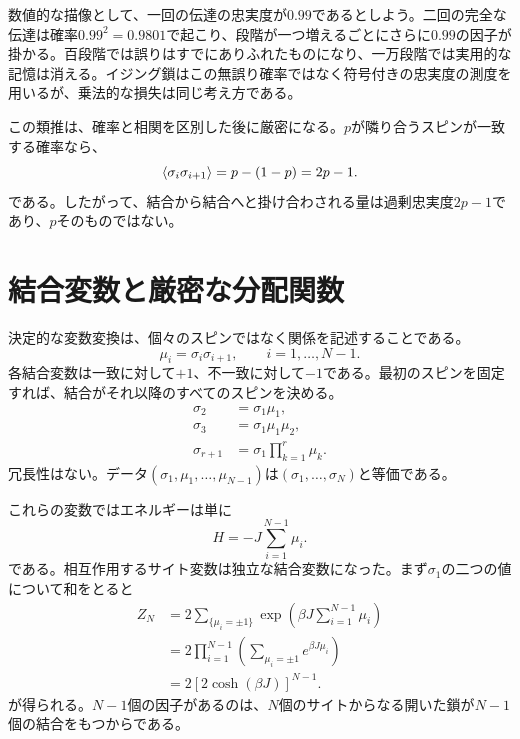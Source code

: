 数値的な描像として、一回の伝達の忠実度が\(0.99\)であるとしよう。二回の完全な伝達は確率\(0.99^2=0.9801\)で起こり、段階が一つ増えるごとにさらに\(0.99\)の因子が掛かる。百段階では誤りはすでにありふれたものになり、一万段階では実用的な記憶は消える。イジング鎖はこの無誤り確率ではなく符号付きの忠実度の測度を用いるが、乗法的な損失は同じ考え方である。

この類推は、確率と相関を区別した後に厳密になる。\(p\)が隣り合うスピンが一致する確率なら、
\begin{equation}
\left\langle\sigma_i\sigma_{i+1}\right\rangle
=p-(1-p)=2p-1.
\end{equation}
である。したがって、結合から結合へと掛け合わされる量は過剰忠実度\(2p-1\)であり、\(p\)そのものではない。

\section{結合変数と厳密な分配関数}

決定的な変数変換は、個々のスピンではなく関係を記述することである。
\begin{equation}
\mu_i=\sigma_i\sigma_{i+1},
\qquad i=1,\ldots,N-1.
\label{eq:bond-variable}
\end{equation}
各結合変数は一致に対して\(+1\)、不一致に対して\(-1\)である。最初のスピンを固定すれば、結合がそれ以降のすべてのスピンを決める。
\begin{align}
\sigma_2&=\sigma_1\mu_1,\\
\sigma_3&=\sigma_1\mu_1\mu_2,\\
\sigma_{r+1}&=\sigma_1\prod_{k=1}^{r}\mu_k.
\end{align}
冗長性はない。データ\((\sigma_1,\mu_1,\ldots,\mu_{N-1})\)は\((\sigma_1,\ldots,\sigma_N)\)と等価である。

これらの変数ではエネルギーは単に
\begin{equation}
H=-J\sum_{i=1}^{N-1}\mu_i.
\end{equation}
である。相互作用するサイト変数は独立な結合変数になった。まず\(\sigma_1\)の二つの値について和をとると
\begin{align}
Z_N
&=2\sum_{\{\mu_i=\pm1\}}
\exp\left(\beta J\sum_{i=1}^{N-1}\mu_i\right)\\
&=2\prod_{i=1}^{N-1}
\left(\sum_{\mu_i=\pm1}e^{\beta J\mu_i}\right)\\
&=2\left[2\cosh(\beta J)\right]^{N-1}.
\label{eq:chain-partition}
\end{align}
が得られる。\(N-1\)個の因子があるのは、\(N\)個のサイトからなる開いた鎖が\(N-1\)個の結合をもつからである。

